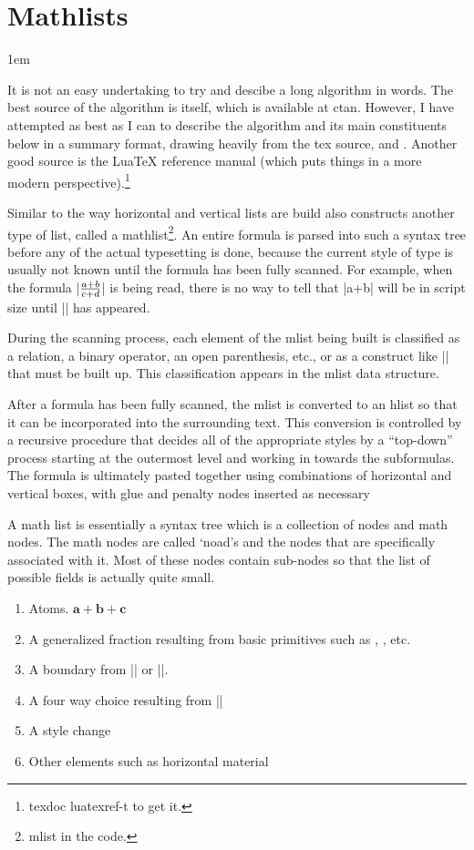 \chapter{Mathlists}
\parindent1em

It is not an easy undertaking to try and descibe a long algorithm in words. The best source
of the algorithm is \tex itself, which is available at ctan. However, I have attempted
as best as I can to describe the algorithm and its main constituents below in a summary format,
drawing heavily from the tex source, \citep{texbytopic} and \citep{breiten}. Another good source
is the LuaTeX reference manual (which puts things in a more modern perspective).\footnote{texdoc luatexref-t to get it.}


Similar to the way horizontal and vertical lists are build \tex also constructs another type of list, called a mathlist\footnote{mlist in the code.}. An entire formula is parsed into such a 
syntax tree before any of the actual
typesetting is done, because the current style of type is usually not
known until the formula has been fully scanned. For example, when the
formula |$a+b \over c+d$| is being read, there is no way to tell
that |a+b| will be in script size until |\over| has appeared.

During the scanning process, each element of the mlist being built is
classified as a relation, a binary operator, an open parenthesis, etc.,
or as a construct like |\sqrt| that must be built up. This classification
appears in the mlist data structure.

After a formula has been fully scanned, the mlist is converted to an hlist
so that it can be incorporated into the surrounding text. This conversion is
controlled by a recursive procedure that decides all of the appropriate
styles by a ``top-down'' process starting at the outermost level and working
in towards the subformulas. The formula is ultimately pasted together using
combinations of horizontal and vertical boxes, with glue and penalty nodes
inserted as necessary

A math list is essentially a syntax tree which is a collection of nodes and  math nodes. The
math nodes are called `noad's and the nodes that are specifically associated with it. Most of these
nodes contain sub-nodes so that the list of possible fields is actually quite small.

\begin{enumerate}
\item Atoms. $\mathbf{a+b+c}$
\item A generalized fraction resulting from basic \tex primitives such as \cmd{\above}, \cmd{\over}, etc.
\item A boundary from |\left| or |\right|.
\item A four way choice resulting from |\mathchoice|
\item A style change
\item Other elements such as horizontal material 
\end{enumerate}

